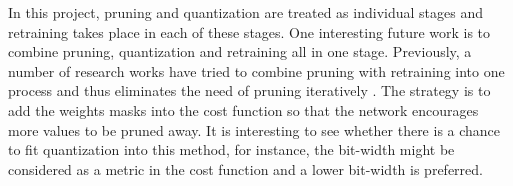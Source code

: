 \documentclass[a4paper,12pt]{report}
\begin{document}
In this project, pruning and quantization are treated as individual stages and
retraining takes place in each of these stages.
One interesting future work is to combine pruning, quantization and
retraining all in one stage.
Previously, a number of research works have tried to combine pruning with
retraining into one process and thus eliminates the need of pruning iteratively
\cite{Hassibi, DBLP:journals/corr/MolchanovTKAK16}.
The strategy is to add the weights masks into the cost function so that the
network encourages more values to be pruned away.
It is interesting to see whether there is a chance to fit quantization into this
method, for instance, the bit-width might be considered as a metric in the cost
function and a lower bit-width is preferred.

\appendix
\singlespacing



\end{document}
